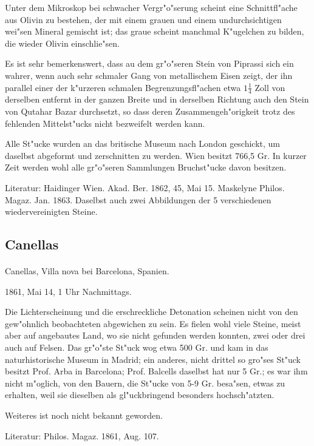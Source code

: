 \documentclass[a4paper, 11pt, oneside]{article}
\begin{document}
Unter dem Mikroskop bei schwacher Vergr"o"serung scheint eine Schnittfl"ache aus Olivin zu bestehen, der mit einem grauen und einem undurchsichtigen wei"sen Mineral gemischt ist; das graue scheint manchmal K"ugelchen zu bilden, die wieder Olivin einschlie"sen.

Es ist sehr bemerkenswert, dass au dem gr"o"seren Stein von Piprassi sich ein wahrer, wenn auch sehr schmaler Gang von metallischem Eisen zeigt, der ihn parallel einer der k"urzeren schmalen Begrenzungsfl"achen etwa $1\frac{1}{4}$ Zoll von derselben entfernt in der ganzen Breite und in derselben Richtung auch den Stein von Qutahar Bazar durchsetzt, so dass deren Zusammengeh"origkeit trotz des fehlenden Mittelst"ucks nicht bezweifelt werden kann.

Alle St"ucke wurden an das britische Museum nach London geschickt, um daselbst abgeformt und zerschnitten zu werden. Wien besitzt 766,5 Gr. In kurzer Zeit werden wohl alle gr"o"seren Sammlungen Bruchst"ucke davon besitzen.

\footnotesize
Literatur: Haidinger Wien. Akad. Ber. 1862, 45, Mai 15. Maskelyne Philos. Magaz. Jan. 1863. Daselbst auch zwei Abbildungen der 5 verschiedenen wiedervereinigten Steine.

\subsection{Canellas}
\normalsize
\paragraph{}
Canellas, Villa nova bei Barcelona, Spanien.

1861, Mai 14, 1 Uhr Nachmittags.

Die Lichterscheinung und die erschreckliche Detonation scheinen nicht von den gew"ohnlich beobachteten abgewichen zu sein. Es fielen wohl viele Steine, meist aber auf angebautes Land, wo sie nicht gefunden werden konnten, zwei oder drei auch auf Felsen. Das gr"o"ste St"uck wog etwa 500 Gr. und kam in das naturhistorische Museum in Madrid; ein anderes, nicht drittel so gro"ses St"uck besitzt Prof. Arba in Barcelona; Prof. Balcells daselbst hat nur 5 Gr.; es war ihm nicht m"oglich, von den Bauern, die St"ucke von 5-9 Gr. besa"sen, etwas zu erhalten, weil sie dieselben als gl"uckbringend besonders hochsch"atzten.

Weiteres ist noch nicht bekannt geworden.

\footnotesize
Literatur: Philos. Magaz. 1861, Aug. 107.
\end{document}
